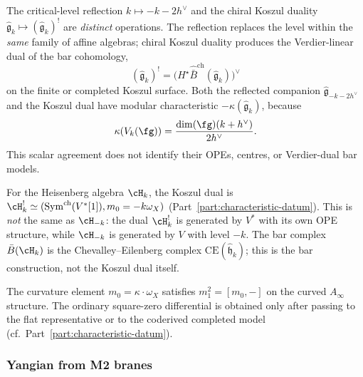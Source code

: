 \begin{example}
The critical-level reflection
$k \mapsto -k - 2h^\vee$ and the chiral Koszul duality
$\widehat{\mathfrak{g}}_k \mapsto (\widehat{\mathfrak{g}}_k)^!$ are
\emph{distinct} operations. The reflection replaces the level within
the \emph{same} family of affine algebras; chiral
Koszul duality produces the Verdier-linear dual of the bar cohomology,
\[
(\widehat{\mathfrak{g}}_k)^!
=
\bigl(H^\star\widehat{\bar{B}}^{\mathrm{ch}}
(\widehat{\mathfrak{g}}_k)\bigr)^\vee
\]
on the finite or completed Koszul surface. Both the reflected
companion $\widehat{\mathfrak g}_{-k-2h^\vee}$ and the Koszul dual have
modular characteristic
$-\kappa(\widehat{\mathfrak g}_k)$, because
\[
\kappa(V_k(\fg))
=
\frac{\dim(\fg)(k+h^\vee)}{2h^\vee}.
\]
This scalar agreement does not identify their OPEs, centres, or
Verdier-dual bar models.

For the Heisenberg algebra $\cH_k$, the Koszul dual is
$\cH_k^!\simeq
(\mathrm{Sym}^{\mathrm{ch}}(V^*[1]),m_0=-k\omega_X)$
(Part~\ref{part:characteristic-datum}). This is \emph{not} the same as
$\cH_{-k}$: the dual $\cH_k^!$ is generated by $V^*$ with its own OPE
structure, while $\cH_{-k}$ is generated by $V$ with level $-k$. The bar complex
$\bar{B}(\cH_k)$ is the Chevalley--Eilenberg complex
$\mathrm{CE}(\hat{\mathfrak{h}}_k)$; this is the bar construction,
not the Koszul dual itself.

The curvature element $m_0 = \kappa \cdot \omega_X$ satisfies
$m_1^2 = [m_0, -]$ on the curved $A_\infty$ structure.  The
ordinary square-zero differential is obtained only after passing to
the flat representative or to the coderived completed model
(cf.\ Part~\ref{part:characteristic-datum}).
\end{example}

\subsubsection{Yangian from M2 branes}

